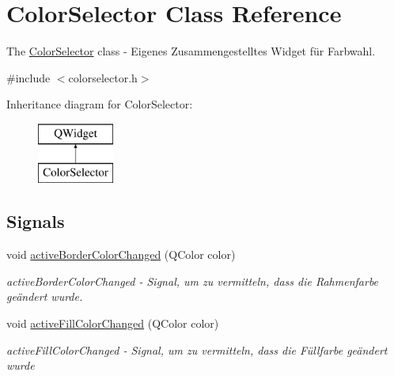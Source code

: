 \hypertarget{class_color_selector}{}\section{Color\+Selector Class Reference}
\label{class_color_selector}


The \hyperlink{class_color_selector}{Color\+Selector} class -\/ Eigenes Zusammengestelltes Widget für Farbwahl.  




{\ttfamily \#include $<$colorselector.\+h$>$}

Inheritance diagram for Color\+Selector\+:\begin{figure}[H]
\begin{center}
\leavevmode
\includegraphics[height=2.000000cm]{class_color_selector}
\end{center}
\end{figure}
\subsection*{Signals}
\begin{DoxyCompactItemize}
\item 
void \hyperlink{class_color_selector_a3ba85a89666dd1ccb6e4274550e60e84}{active\+Border\+Color\+Changed} (Q\+Color color)
\begin{DoxyCompactList}\small\item\em active\+Border\+Color\+Changed -\/ Signal, um zu vermitteln, dass die Rahmenfarbe geändert wurde. \end{DoxyCompactList}\item 
void \hyperlink{class_color_selector_a62847504579be68c5bdb138ef7033b20}{active\+Fill\+Color\+Changed} (Q\+Color color)
\begin{DoxyCompactList}\small\item\em active\+Fill\+Color\+Changed -\/ Signal, um zu vermitteln, dass die Füllfarbe geändert wurde \end{DoxyCompactList}\end{DoxyCompactItemize}
